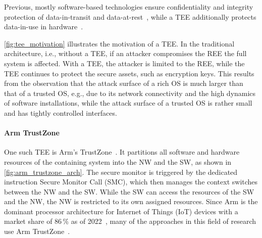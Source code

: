 
Previous, mostly software-based technologies ensure confidentiality and integrity protection of data-in-transit and data-at-rest~\cite{Pecholt2022}, while a \ac{TEE} additionally protects data-in-use in hardware~\cite{Pecholt2022, Lee:EECS-2022-96}.


\autoref{fig:tee_motivation} illustrates the motivation of a \ac{TEE}\@.
In the traditional architecture, i.e., without a \ac{TEE}, if an attacker compromises the \ac{REE} the full system is affected.
With a \ac{TEE}, the attacker is limited to the \ac{REE}, while the \ac{TEE} continues to protect the secure assets, such as encryption keys.
This results from the observation that the attack surface of a rich OS is much larger than that of a trusted OS, e.g., due to its network connectivity and the high dynamics of software installations, while the attack surface of a trusted OS is rather small and has tightly controlled interfaces.




\paragraph{Arm TrustZone}
One such \ac{TEE} is Arm's TrustZone~\cite{ARM09, Ngabonziza2016}. It partitions all software and hardware resources of the containing system into the \ac{NW} and the \ac{SW}, as shown in \autoref{fig:arm_trustzone_arch}. The secure monitor is triggered by the dedicated instruction Secure Monitor Call (SMC), which then manages the context switches between the \ac{NW} and the \ac{SW}.
While the \ac{SW} can access the resources of the \ac{SW} and the \ac{NW}, the \ac{NW} is restricted to its own assigned resources.
Since Arm is the dominant processor architecture for Internet of Things (IoT) devices with a market share of 86\,\% as of 2022~\cite{eclipse}, many of the approaches in this field of research use Arm TrustZone~\cite{Valadares2021}.

